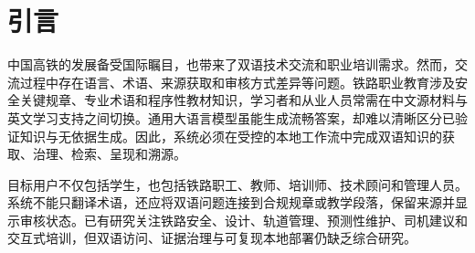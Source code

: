 \begin{abstract}

\textbf{研究背景：} 中国高铁技术的国际化应用不断扩大，使双语知识传递与职业培训需求持续增长。现有铁路大语言模型研究往往分别考察领域适配或检索增强生成，对双语模型适配、治理式检索与证据来源之间的协同关系缺少联合验证。因此，本研究以知识增强型大语言模型为核心，构建受治理的双语铁路问答工作流。

\textbf{研究方法：} 研究构建专家治理的双语铁路语料，并采用按知识对分组的控制策略，隔离训练、验证与留出评估记录。实验比较 Qwen2.5-7B 和 GLM-4-9B 在双语 QLoRA 适配前后的表现，并以 Qwen3-14B 作为参考模型；在留出双语查询上比较 BM25、BGE-M3 密集检索与倒数排名融合混合检索。模型适配采用独立的双语问答评估，并辅以受控的无检索生成与检索增强生成比较。

\textbf{研究结果：} 混合检索在中文和英文上的证据 Recall@5 分别达到 0.715 和 0.708，均高于对应最优单一检索器的 0.690 和 0.685；双语字段索引取得最高的跨语言均衡均值 0.696。Qwen QLoRA 将中文留出问答字符级 F1 从 0.189 提升至 0.398，将英文从 0.437 提升至 0.648，且两项提升经 Holm 校正后仍具有显著性。在混合检索增强生成条件下，其 Answer F1 达到最高的 0.660 和 0.651，高于 Qwen3-14B 参考模型的 0.442 和 0.454。

\textbf{研究结论：} 该工作流在本评估条件下改善了双语证据访问和领域问答表现。翻译和引用遵循结果具有任务依赖性，适配输出在实际使用前仍应由作者和铁路领域专家进行人工审核。

\textbf{关键词：} 双语铁路教育；检索增强生成；QLoRA 适配；Web 信息系统

\end{abstract}

\section{引言}

中国高铁的发展备受国际瞩目，也带来了双语技术交流和职业培训需求。然而，交流过程中存在语言、术语、来源获取和审核方式差异等问题。铁路职业教育涉及安全关键规章、专业术语和程序性教材知识，学习者和从业人员常需在中文源材料与英文学习支持之间切换。通用大语言模型虽能生成流畅答案，却难以清晰区分已验证知识与无依据生成。因此，系统必须在受控的本地工作流中完成双语知识的获取、治理、检索、呈现和溯源。

目标用户不仅包括学生，也包括铁路职工、教师、培训师、技术顾问和管理人员。系统不能只翻译术语，还应将双语问题连接到合规规章或教学段落，保留来源并显示审核状态。已有研究关注铁路安全、设计、轨道管理、预测性维护、司机建议和交互式培训，但双语访问、证据治理与可复现本地部署仍缺乏综合研究。

